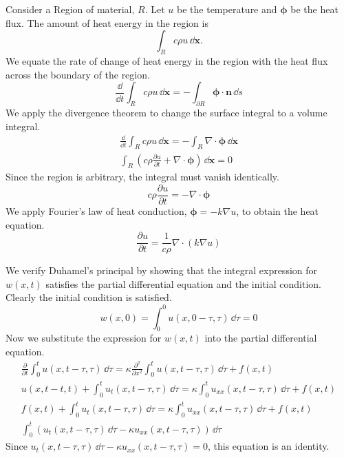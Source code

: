 {%
\begin{Solution}
  Consider a Region of material, $R$.  Let $u$ be the temperature and 
  $\boldsymbol{\phi}$ be the heat flux.  The amount of heat energy in the region
  is
  \[
  \int_R c \rho u \,\dd \mathbf{x}.
  \]
  We equate the rate of change of heat energy in the region with the 
  heat flux across the boundary of the region.
  \[
  \frac{\dd}{\dd t} \int_R c \rho u \,\dd \mathbf{x}
  = - \int_{\partial R} \boldsymbol{\phi} \cdot \mathbf{n} \,\dd s
  \]
  We apply the divergence theorem to change the surface integral to a volume 
  integral.
  \begin{gather*}
    \frac{\dd}{\dd t} \int_R c \rho u \,\dd \mathbf{x}
    = - \int_R \nabla \cdot \boldsymbol{\phi} \,\dd \mathbf{x}
    \\
    \int_R \left( c \rho \frac{\partial u}{\partial t} + \nabla \cdot \boldsymbol{\phi} \right) \,\dd \mathbf{x}
    = 0
  \end{gather*}
  Since the region is arbitrary, the integral must vanish identically.
  \[
  c \rho \frac{\partial u}{\partial t} = - \nabla \cdot \boldsymbol{\phi}
  \]
  We apply Fourier's law of heat conduction, $\boldsymbol{\phi} = - k \nabla u$,
  to obtain the heat equation.
  \[
  \frac{\partial u}{\partial t} = \frac{1}{c \rho} \nabla \cdot (k \nabla u)
  \]
\end{Solution}









\begin{Solution}
  We verify Duhamel's principal by showing that the integral expression for 
  $w(x,t)$ satisfies the partial differential equation and the initial 
  condition.  Clearly the initial condition is satisfied.
  \[
  w(x,0) = \int_0^0 u(x,0-\tau, \tau) \,\dd \tau = 0
  \]
  Now we substitute the expression for $w(x,t)$ into the partial differential
  equation.
  \begin{gather*}
    \frac{\partial}{\partial t} \int_0^t u(x,t-\tau,\tau) \,\dd \tau 
    = \kappa \frac{\partial^2}{\partial x^2} \int_0^t u(x,t-\tau,\tau) \,\dd \tau + f(x,t) \\
    u(x,t-t,t) + \int_0^t u_t(x,t-\tau,\tau)\,\dd \tau
    = \kappa \int_0^t u_{x x}(x,t-\tau,\tau)\,\dd \tau + f(x,t) \\
    f(x,t) + \int_0^t u_t(x,t-\tau,\tau)\,\dd \tau
    = \kappa \int_0^t u_{x x}(x,t-\tau,\tau)\,\dd \tau + f(x,t) \\
    \int_0^t \left( u_t(x,t-\tau,\tau)\,\dd \tau - \kappa u_{x x}(x,t-\tau,\tau)
    \right) \,\dd \tau 
  \end{gather*}
  Since $u_t(x,t-\tau,\tau)\,\dd \tau - \kappa u_{x x}(x,t-\tau,\tau) = 0$, this
  equation is an identity.  
\end{Solution}







}
